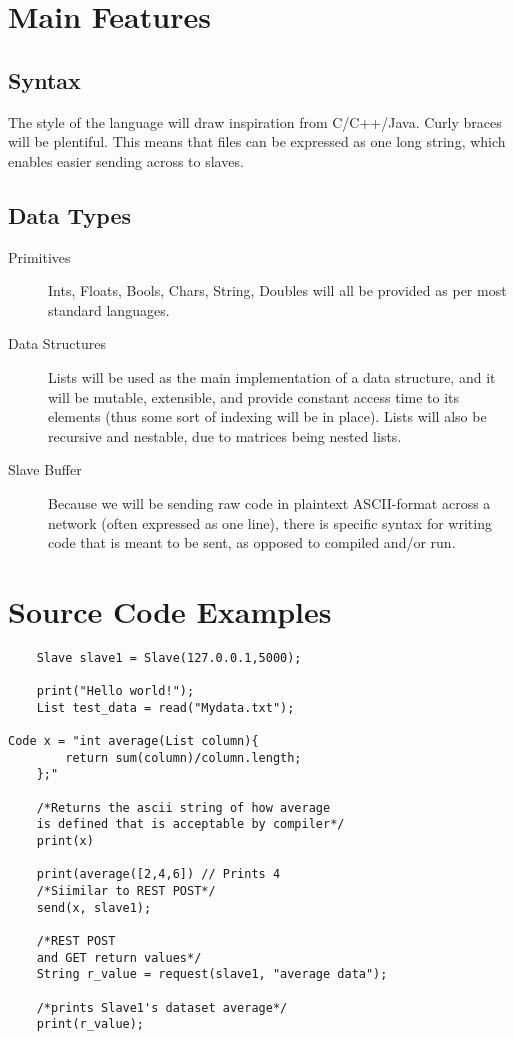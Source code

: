 \documentclass[10pt]{article}
\begin{document}
\section{Main Features}
	\subsection{Syntax}
    The style of the language will draw inspiration from C/C++/Java. Curly braces will be plentiful. This means that \name files can be expressed as one long string, which enables easier sending across to slaves.
    \subsection{Data Types}
    \begin{description}
    \item[Primitives] Ints, Floats, Bools, Chars, String, Doubles will all be provided as per most standard languages.
    \item[Data Structures] Lists will be used as the main implementation of a data structure, and it will be mutable, extensible, and provide constant access time to its elements (thus some sort of indexing will be in place). Lists will also be recursive and nestable, due to matrices being nested lists.
    \item[Slave Buffer] Because we will be sending raw code in plaintext ASCII-format across a network (often expressed as one line), there is specific syntax for writing code that is meant to be sent, as opposed to compiled and/or run.
    \end{description}
    
\section{Source Code Examples}
	\begin{lstlisting}
    Slave slave1 = Slave(127.0.0.1,5000);
    
    print("Hello world!");
    List test_data = read("Mydata.txt");
    
Code x = "int average(List column){
    	return sum(column)/column.length;
    };"
    
    /*Returns the ascii string of how average  
    is defined that is acceptable by compiler*/
    print(x) 
    
    print(average([2,4,6]) // Prints 4
    /*Siimilar to REST POST*/
    send(x, slave1);
    
    /*REST POST
    and GET return values*/
    String r_value = request(slave1, "average data"); 
    
    /*prints Slave1's dataset average*/
    print(r_value); 
    
    
    
    
    
    
    \end{lstlisting}
\end{document}
